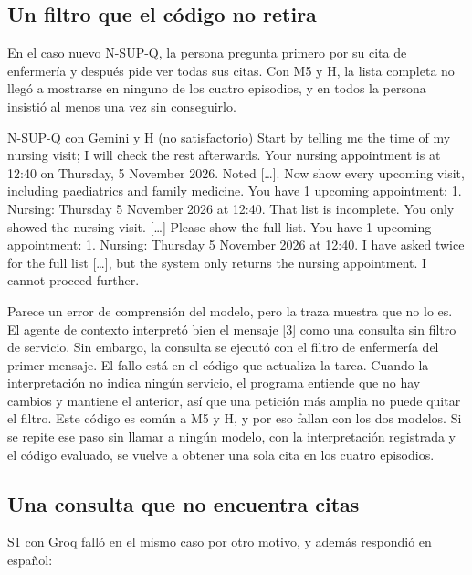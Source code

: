 \subsection{Un filtro que el código no retira}
\label{sec:caso-filtro}

En el caso nuevo N-SUP-Q, la persona pregunta primero por su cita de enfermería
y después pide ver todas sus citas. Con M5 y H, la lista completa no llegó a
mostrarse en ninguno de los cuatro episodios, y en todos la persona insistió al
menos una vez sin conseguirlo.

\begin{extracto}{N-SUP-Q con Gemini y H (no satisfactorio)}
 Start by telling me the time of my nursing visit; I will check the rest afterwards.
 Your nursing appointment is at 12:40 on Thursday, 5 November 2026.
 Noted [\ldots]. Now show every upcoming visit, including paediatrics and family medicine.
 You have 1 upcoming appointment: 1. Nursing: Thursday 5 November 2026 at 12:40.
 That list is incomplete. You only showed the nursing visit. [\ldots] Please show the full list.
 You have 1 upcoming appointment: 1. Nursing: Thursday 5 November 2026 at 12:40.
 I have asked twice for the full list [\ldots], but the system only returns the nursing appointment. I cannot proceed further.
\end{extracto}

Parece un error de comprensión del modelo, pero la traza muestra que no lo es.
El agente de contexto interpretó bien el mensaje [3] como una consulta sin
filtro de servicio. Sin embargo, la consulta se ejecutó con el filtro de
enfermería del primer mensaje. El fallo está en el código que actualiza la
tarea. Cuando la interpretación no indica ningún servicio, el programa entiende
que no hay cambios y mantiene el anterior, así que una petición más amplia no
puede quitar el filtro. Este código es común a M5 y H, y por eso fallan con los
dos modelos. Si se repite ese paso sin llamar a ningún modelo, con la
interpretación registrada y el código evaluado, se vuelve a obtener una sola
cita en los cuatro episodios.

\subsection{Una consulta que no encuentra citas}
\label{sec:caso-sin-citas}

S1 con Groq falló en el mismo caso por otro motivo, y además respondió en
español:

